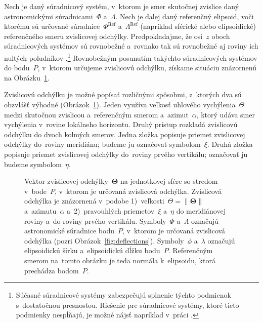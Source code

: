 \documentclass[a4paper, 12pt]{book}
\begin{document}
Nech je daný súradnicový systém, v~ktorom je smer skutočnej zvislice daný 
astronomickými súradnicami~$\Phi$ a~$\Lambda$.  Nech je ďalej daný referenčný 
elipsoid, voči ktorému sú určované súradnice~$\Phi^{\mathrm{Ref}}$ 
a~$\Lambda^{\mathrm{Ref}}$ (napríklad sférické alebo elipsoidické) referenčného 
smeru zvislicovej odchýlky.  Predpokladajme, že osi~$z$ oboch súradnicových 
systémov sú rovnobežné a~rovnako tak sú rovnobežné aj roviny ich nultých 
poludníkov \parencite{TorgeGeodesy}.\footnote{Súčasné súradnicové systémy 
zabezpečujú splnenie týchto podmienok s~dostatočnou presnosťou.  Riešenie pre 
súradnicové systémy, ktoré tieto podmienky nespĺňajú, je možné nájsť napríklad 
v~práci \textcite{Pick2000}.}  Rovnobežným posunutím takýchto súradnicových 
systémov do bodu~$P$, v~ktorom určujeme zvislicovú odchýlku, získame situáciu 
znázornenú na Obrázku~\ref{fig:deflections_unit_sphere}.

Zvislicovú odchýlku je možné popísať rozličnými spôsobmi, z~ktorých dva sú 
obzvlášť výhodné (Obrázok~\ref{fig:deflections_unit_sphere}).  Jeden využíva 
veľkosť uhlového vychýlenia~$\Theta$ medzi skutočnou zvislicou a~referenčným 
smerom a~azimut~$\alpha$, ktorý udáva smer vychýlenia v~rovine lokálneho 
horizontu.  Druhý prístup rozkladá zvislicovú odchýlku do dvoch kolmých smerov.  
Jedna zložka popisuje priemet zvislicovej odchýlky do~roviny meridiánu; budeme 
ju označovať symbolom~$\xi$.  Druhá zložka popisuje priemet zvislicovej 
odchýlky do~roviny prvého vertikálu; označovať ju budeme symbolom~$\eta$.

\begin{figure}[bt]
\centering

\caption{Vektor zvislicovej odchýlky~$\boldsymbol\Theta$ na jednotkovej sfére 
so stredom v~bode~$P$, v~ktorom je určovaná zvislicová odchýlka.  Zvislicová 
odchýlka je znázornená v~podobe 1)~veľkosti~$\Theta = \| \boldsymbol\Theta \|$ 
a~azimutu~$\alpha$ a~2)~pravouhlých priemetov~$\xi$ a~$\eta$ do meridiánovej 
roviny a~do roviny prvého vertikálu.  Symboly~$\Phi$ a~$\Lambda$ označujú 
astronomické súradnice bodu~$P$, v~ktorom je určovaná zvislicová odchýlka 
(pozri Obrázok~\ref{fig:deflections}).  Symboly~$\phi$ a~$\lambda$ označujú 
elipsoidickú šírku a~elipsoidickú dĺžku bodu~$P$.  Referenčným smerom na~tomto 
obrázku je teda normála k~elipsoidu, ktorá prechádza bodom~$P$.}
\label{fig:deflections_unit_sphere}
\end{figure}
\end{document}

